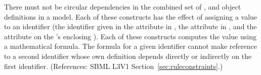 There must not be circular dependencies in the combined set of
\InitialAssignment, \AssignmentRule and \KineticLaw object definitions in a
model.  Each of these constructs has the effect of assigning a value to an
identifier (\ie the identifier given in the attribute  in
\InitialAssignment, the attribute  in \AssignmentRule, and
the attribute  on the \KineticLaw's enclosing \Reaction).  Each
of these constructs computes the value using a mathematical formula.  The
formula for a given identifier cannot make reference to a second identifier
whose own definition depends directly or indirectly on the first
identifier.  (References: SBML L3V1 Section~\ref{sec:ruleconstraints}.)

